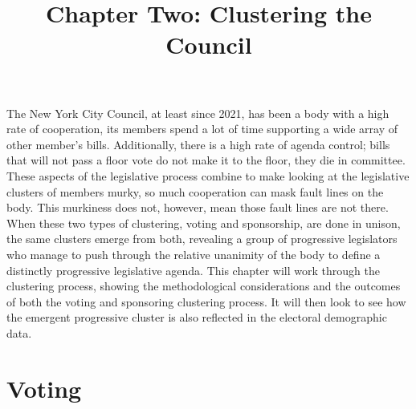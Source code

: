 \documentclass[
  letterpaper,
  DIV=11,
  numbers=noendperiod]{scrartcl}
\title{Chapter Two: Clustering the Council}
\author{}
\date{}
\begin{document}
\maketitle
\ifdefined\Shaded\renewenvironment{Shaded}{\begin{tcolorbox}[frame hidden, interior hidden, enhanced, breakable, borderline west={3pt}{0pt}{shadecolor}, boxrule=0pt, sharp corners]}{\end{tcolorbox}}\fi

The New York City Council, at least since 2021, has been a body with a
high rate of cooperation, its members spend a lot of time supporting a
wide array of other member's bills. Additionally, there is a high rate
of agenda control; bills that will not pass a floor vote do not make it
to the floor, they die in committee. These aspects of the legislative
process combine to make looking at the legislative clusters of members
murky, so much cooperation can mask fault lines on the body. This
murkiness does not, however, mean those fault lines are not there. When
these two types of clustering, voting and sponsorship, are done in
unison, the same clusters emerge from both, revealing a group of
progressive legislators who manage to push through the relative
unanimity of the body to define a distinctly progressive legislative
agenda. This chapter will work through the clustering process, showing
the methodological considerations and the outcomes of both the voting
and sponsoring clustering process. It will then look to see how the
emergent progressive cluster is also reflected in the electoral
demographic data.

\hypertarget{voting}{%
\section{Voting}\label{voting}}
\end{document}
